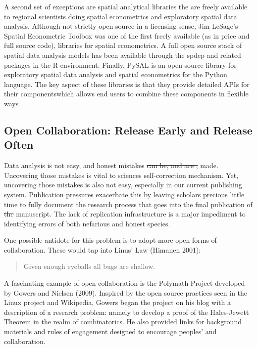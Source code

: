\documentclass{article}
\providecommand{\DIFadd}[1]{{\protect\color{blue}\uwave{#1}}} %
\providecommand{\DIFdel}[1]{{\protect\color{red}\sout{#1}}}                      %
\providecommand{\DIFaddbegin}{} %
\providecommand{\DIFaddend}{} %
\providecommand{\DIFdelbegin}{} %
\providecommand{\DIFdelend}{} %
\begin{document}
A second set of exceptions are spatial analytical libraries the are
freely available to regional scientists doing spatial econometrics and
exploratory spatial data analysis. Although not strictly open source in
a licensing sense, Jim LeSage's Spatial Econometric Toolbox was one of
the first freely available (as in price and full source code), libraries
for spatial econometrics. A full open source stack of spatial data
analysis models has been available through the spdep and related
packages in the R environment. Finally, PySAL is an open source library
for exploratory spatial data analysis and spatial econometrics for the
Python language. The key aspect of these libraries is that they provide
detailed APIs for their components\DIFaddbegin \DIFadd{, }\DIFaddend which allows end users to combine
these components in flexible ways

\subsection{Open Collaboration: Release Early and Release
Often}\label{open-collaboration-release-early-and-release-often}

Data analysis is not easy, and honest mistakes \DIFdelbegin \DIFdel{can be, and are , }\DIFdelend \DIFaddbegin \DIFadd{are }\DIFaddend made. Uncovering
those mistakes is vital to sciences self-correction mechanism. Yet,
uncovering those mistakes is also not easy, especially in our current
publishing system. Publication pressures exacerbate this by leaving
scholars precious little time to fully document the research process
that goes into the final publication of \DIFdelbegin \DIFdel{the }\DIFdelend \DIFaddbegin \DIFadd{a given }\DIFaddend manuscript. The lack of
replication infrastructure is a major impediment to identifying errors
of both nefarious and honest species.

One possible antidote for this problem is to adopt more open forms of
collaboration. These would tap into Linus' Law (Himanen 2001):

\begin{quote}
Given enough eyeballs all bugs are shallow.
\end{quote}

A fascinating example of open collaboration is the Polymath Project
developed by Gowers and Nielsen (2009). Inspired by the open source
practices seen in the Linux project and Wikipedia, Gowers began the
project on his blog with a description of a research problem: namely to
develop a proof of the Hales-Jewett Theorem in the realm of
combinatorics. He also provided links for background materials and rules
of engagement designed to encourage peoples' and collaboration.
\end{document}

